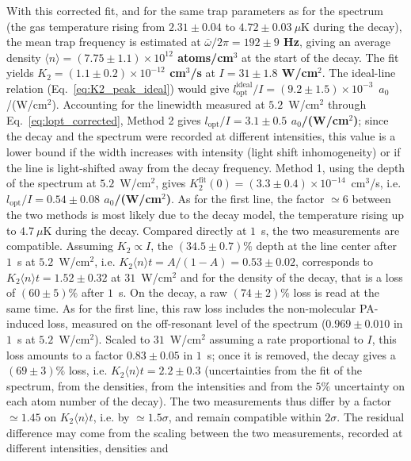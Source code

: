 With this corrected fit, and for the same trap parameters as for the spectrum (the gas
temperature rising from $2.31\pm0.04$ to $4.72\pm0.03~\mu$K during the decay), the mean trap frequency is
estimated at
\textbf{$\bar\omega/2\pi = 192\pm9$ Hz}, giving an average density
\textbf{$\langle n\rangle = (7.75\pm1.1)\times10^{12}$ atoms/cm$^3$} at the start of the decay.
The fit yields \textbf{$K_2 = (1.1\pm0.2)\times10^{-12}$ cm$^3$/s} at
\textbf{$I=31\pm1.8$ W/cm$^2$}. The ideal-line relation (Eq.~\ref{eq:K2_peak_ideal}) would
give $l_{\text{opt}}^{\text{ideal}}/I=(9.2\pm1.5)\times10^{-3}$~$a_0$/(W/cm$^2$).
Accounting for the linewidth measured at $5.2$~W/cm$^2$ through
Eq.~\ref{eq:lopt_corrected}, Method 2 gives
\textbf{$l_{\text{opt}}/I=3.1\pm0.5$ $a_0$/(W/cm$^2$)}; since the decay and the
spectrum were recorded at different intensities, this value is a lower bound if the
width increases with intensity (light shift inhomogeneity) or if the line is
light-shifted away from the decay frequency. Method 1, using the depth of the
spectrum at $5.2$~W/cm$^2$, gives $K_2^{\text{fit}}(0) = (3.3\pm0.4)\times10^{-14}$~cm$^3$/s,
i.e. \textbf{$l_{\text{opt}}/I=0.54\pm0.08$ $a_0$/(W/cm$^2$)}. As for the first line, the
factor $\simeq6$ between the two methods is most likely due to the decay model, the
temperature rising up to $4.7~\mu$K during the decay.
Compared directly at $1$~s, the two measurements are compatible.
Assuming $K_2\propto I$, the $(34.5\pm0.7)\%$ depth at the line center after $1$~s at
$5.2$~W/cm$^2$, i.e. $K_2\langle n\rangle t=A/(1-A)=0.53\pm0.02$, corresponds to
$K_2\langle n\rangle t=1.52\pm0.32$ at $31$~W/cm$^2$ and for the density of the decay, that
is a loss of $(60\pm5)\%$ after $1$~s. On the decay, a raw $(74\pm2)\%$ loss is read at the
same time. As for the first line, this raw loss includes the non-molecular PA-induced
loss, measured on the off-resonant level of the spectrum ($0.969\pm0.010$ in $1$~s at
$5.2$~W/cm$^2$). Scaled to $31$~W/cm$^2$ assuming a rate proportional to $I$, this loss
amounts to a factor $0.83\pm0.05$ in $1$~s; once it is removed, the decay gives a
$(69\pm3)\%$ loss, i.e. $K_2\langle n\rangle t=2.2\pm0.3$ (uncertainties from the fit of the
spectrum, from the densities, from the intensities and from the $5\%$ uncertainty on each
atom number of the decay). The two measurements thus
differ by a factor $\simeq1.45$ on $K_2\langle n\rangle t$, i.e. by $\simeq1.5\sigma$, and
remain compatible within $2\sigma$. The residual difference may come from the scaling
between the two measurements, recorded at different intensities, densities and
